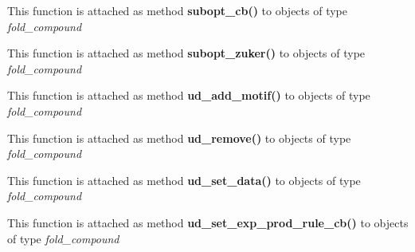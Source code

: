 \begin{DoxyRefList}
\item[\label{wrappers__wrappers000091}%
\Hypertarget{wrappers__wrappers000091}%
Global \mbox{\hyperlink{group__subopt__wuchty_ga1053837e6b6f158093508f8a70998352}{vrna\+\_\+subopt\+\_\+cb}} (vrna\+\_\+fold\+\_\+compound\+\_\+t $\ast$vc, int delta, vrna\+\_\+subopt\+\_\+callback $\ast$cb, void $\ast$data)]This function is attached as method {\bfseries subopt\+\_\+cb()} to objects of type {\itshape fold\+\_\+compound}  
\item[\label{wrappers__wrappers000092}%
\Hypertarget{wrappers__wrappers000092}%
Global \mbox{\hyperlink{group__subopt__zuker_gababde9d210eb433854f1e71da7815fbb}{vrna\+\_\+subopt\+\_\+zuker}} (vrna\+\_\+fold\+\_\+compound\+\_\+t $\ast$vc)]This function is attached as method {\bfseries subopt\+\_\+zuker()} to objects of type {\itshape fold\+\_\+compound}  
\item[\label{wrappers__wrappers000068}%
\Hypertarget{wrappers__wrappers000068}%
Global \mbox{\hyperlink{group__domains__up_gaec0c3313fb2951946614f920d289829a}{vrna\+\_\+ud\+\_\+add\+\_\+motif}} (vrna\+\_\+fold\+\_\+compound\+\_\+t $\ast$vc, const char $\ast$motif, double motif\+\_\+en, unsigned int loop\+\_\+type)]This function is attached as method {\bfseries ud\+\_\+add\+\_\+motif()} to objects of type {\itshape fold\+\_\+compound}  
\item[\label{wrappers__wrappers000069}%
\Hypertarget{wrappers__wrappers000069}%
Global \mbox{\hyperlink{group__domains__up_gada59cb0c498b812eadd010811af3f2d4}{vrna\+\_\+ud\+\_\+remove}} (vrna\+\_\+fold\+\_\+compound\+\_\+t $\ast$vc)]This function is attached as method {\bfseries ud\+\_\+remove()} to objects of type {\itshape fold\+\_\+compound}  
\item[\label{wrappers__wrappers000070}%
\Hypertarget{wrappers__wrappers000070}%
Global \mbox{\hyperlink{group__domains__up_gac1f18c312b91d80089534a87d956e58b}{vrna\+\_\+ud\+\_\+set\+\_\+data}} (vrna\+\_\+fold\+\_\+compound\+\_\+t $\ast$vc, void $\ast$data, vrna\+\_\+callback\+\_\+free\+\_\+auxdata $\ast$free\+\_\+cb)]This function is attached as method {\bfseries ud\+\_\+set\+\_\+data()} to objects of type {\itshape fold\+\_\+compound}  
\item[\label{wrappers__wrappers000072}%
\Hypertarget{wrappers__wrappers000072}%
Global \mbox{\hyperlink{group__domains__up_ga2fb1db2099da26c76247e1209ad4aa09}{vrna\+\_\+ud\+\_\+set\+\_\+exp\+\_\+prod\+\_\+rule\+\_\+cb}} (vrna\+\_\+fold\+\_\+compound\+\_\+t $\ast$vc, vrna\+\_\+callback\+\_\+ud\+\_\+exp\+\_\+production $\ast$pre\+\_\+cb, vrna\+\_\+callback\+\_\+ud\+\_\+exp\+\_\+energy $\ast$exp\+\_\+e\+\_\+cb)]This function is attached as method {\bfseries ud\+\_\+set\+\_\+exp\+\_\+prod\+\_\+rule\+\_\+cb()} to objects of type {\itshape fold\+\_\+compound}  

\end{DoxyRefList}
